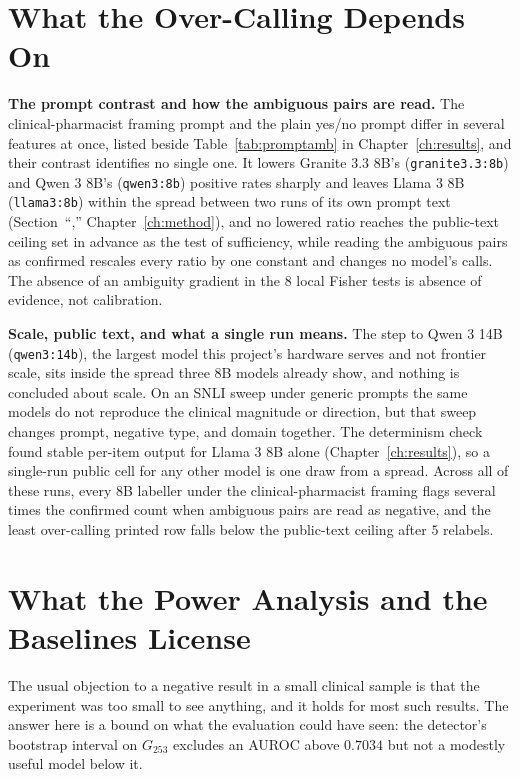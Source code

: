 \section{What the Over-Calling Depends On}
\label{sec:disc-overcalling}

\textbf{The prompt contrast and how the ambiguous pairs are read.} The
clinical-pharmacist framing prompt and the plain yes/no prompt differ in several
features at once, listed beside Table~\ref{tab:promptamb} in
Chapter~\ref{ch:results}, and their contrast identifies no single one. It lowers
Granite 3.3 8B's (\texttt{granite3.3:8b}) and Qwen 3 8B's (\texttt{qwen3:8b})
positive rates sharply and leaves Llama 3 8B (\texttt{llama3:8b}) within the
spread between two runs of its own prompt text
(Section~``,'' Chapter~\ref{ch:method}), and no lowered ratio reaches the public-text ceiling set in advance as the test of
sufficiency, while reading the ambiguous pairs as confirmed rescales every ratio by one
constant and changes no model's calls. The absence of an ambiguity gradient in the $8$ local Fisher tests is
absence of evidence, not calibration.

\textbf{Scale, public text, and what a single run means.} The step to
Qwen 3 14B (\texttt{qwen3:14b}), the largest model this project's hardware serves
and not frontier scale, sits inside the spread three 8B models already show, and
nothing is concluded about scale. On an SNLI sweep under generic prompts the same
models do not reproduce the clinical magnitude or direction, but that sweep
changes prompt, negative type, and domain together. The determinism check found stable per-item output for Llama 3 8B alone
(Chapter~\ref{ch:results}), so a single-run public cell for any other model is one draw from
a spread. Across all of these runs, every
8B labeller under the clinical-pharmacist framing flags several times the
confirmed count when ambiguous pairs are read as negative, and the least
over-calling printed row falls below the public-text ceiling after $5$ relabels.

\section{What the Power Analysis and the Baselines License}
\label{sec:disc-null}

The usual objection to a negative result in a small clinical sample is that the
experiment was too small to see anything, and it holds for most such results. The answer
here is a bound on what the evaluation could have seen: the detector's
bootstrap interval on $G_{253}$ excludes an AUROC above $0.7034$ but not a
modestly useful model below it.

